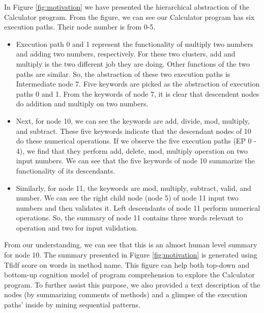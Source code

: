In Figure \ref{fig:motivation} we have presented the hierarchical abstraction of the Calculator program. From the figure, we can see our Calculator program has six execution paths. Their node number is from 0-5. 
\begin{itemize}
    \item Execution path 0 and 1 represent the functionality of multiply two numbers and adding two numbers, respectively. For these two clusters, add and multiply is the two different job they are doing. Other functions of the two paths are similar. So, the abstraction of these two execution paths is Intermediate node 7. Five keywords are picked as the abstraction of execution paths 0 and 1. From the keywords of node 7, it is clear that descendent nodes do addition and multiply on two numbers.
    \item Next, for node 10, we can see the keywords are add, divide, mod, multiply, and subtract. These five keywords indicate that the descendant nodes of 10 do these numerical operations. If we observe the five execution paths (EP 0 - 4), we find that they perform add, delete, mod, multiply operation on two input numbers. We can see that the five keywords of node 10 summarize the functionality of its descendants.
    \item Similarly, for node 11, the keywords are mod, multiply, subtract, valid, and number. We can see the right child node (node 5) of node 11 input two numbers and then validates it. Left descendants of node 11 perform numerical operations. So, the summary of node 11 contains three words relevant to operation and two for input validation.
\end{itemize}
   From our understanding, we can see that this is an almost human level summary for node 10. The summary presented in Figure \ref{fig:motivation} is generated using Tfidf score on words in method name. This figure can help both top-down and bottom-up cognition model of program comprehension to explore the Calculator program. To further assist this purpose, we also provided a text description of the nodes (by summarizing comments of methods) and a glimpse of the execution paths' inside by mining sequential patterns.  
